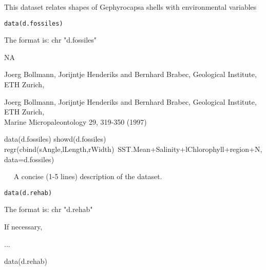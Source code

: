 \documentclass{article}
\begin{document}
\begin{Description}\relax
This dataset relates shapes of Gephyrocapsa shells with environmental
variables
\end{Description}
\begin{Usage}
\begin{verbatim}data(d.fossiles)\end{verbatim}
\end{Usage}
\begin{Format}\relax
The format is:
chr "d.fossiles"
\end{Format}
\begin{Details}\relax
NA
\end{Details}
\begin{Source}\relax
Joerg Bollmann, Jorijntje Henderiks and Bernhard Brabec,
Geological Institute, ETH Zurich,
\end{Source}
\begin{References}\relax
Joerg Bollmann, Jorijntje Henderiks and Bernhard Brabec,
Geological Institute, ETH Zurich,\\
Marine Micropaleontology 29, 319-350 (1997)
\end{References}
\begin{Examples}
\begin{ExampleCode}
data(d.fossiles)
showd(d.fossiles)
regr(cbind(sAngle,lLength,rWidth)~SST.Mean+Salinity+lChlorophyll+region+N,
                data=d.fossiles)
\end{ExampleCode}
\end{Examples}

\begin{Description}\relax
~~ A concise (1-5 lines) description of the dataset. ~~
\end{Description}
\begin{Usage}
\begin{verbatim}data(d.rehab)\end{verbatim}
\end{Usage}
\begin{Format}\relax
The format is:
chr "d.rehab"
\end{Format}
\begin{Details}\relax
If necessary,
\end{Details}
\begin{Source}\relax
...
\end{Source}
\begin{Examples}
\begin{ExampleCode}
data(d.rehab)
\end{ExampleCode}
\end{Examples}
\end{document}
